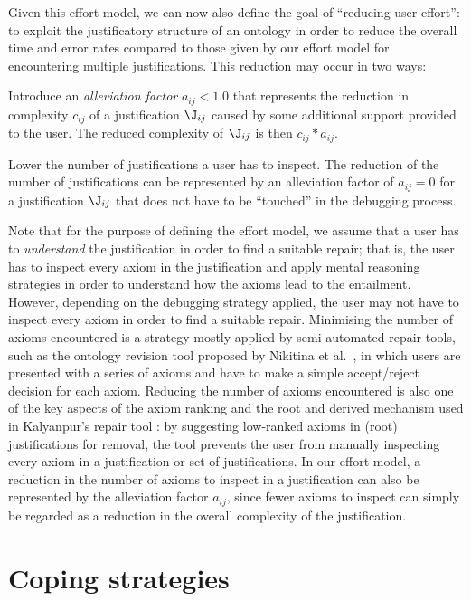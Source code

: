 Given this effort model, we can now also define the goal of \enquote{reducing user effort}: to exploit the justificatory structure of an ontology in order to reduce the overall time and error rates compared to those given by our effort model for encountering multiple justifications. This reduction may occur in two ways:
\begin{compactenum}
\item Introduce an \emph{alleviation factor} $a_{ij} < 1.0 $ that represents the reduction in complexity $c_{ij}$ of a justification $\J_{ij}$ caused by some additional support provided to the user. The reduced complexity of $\J_{ij}$ is then $c_{ij} * a_{ij}$.
\item Lower the number of justifications a user has to inspect. The reduction of the number of justifications can be represented by an alleviation factor of $a_{ij} = 0$ for a justification $\J_{ij}$ that does not have to be \enquote{touched} in the debugging process.
\end{compactenum}

Note that for the purpose of defining the effort model, we assume that a user has to \emph{understand} the justification in order to find a suitable repair; that is, the user has to inspect every axiom in the justification and apply mental reasoning strategies in order to understand how the axioms lead to the entailment. However, depending on the debugging strategy applied, the user may not have to inspect every axiom in order to find a suitable repair. Minimising the number of axioms encountered is a strategy mostly applied by semi-automated repair tools, such as the ontology revision tool proposed by Nikitina et al.\ \cite{nikitina12aa}, in which users are presented with a series of axioms and have to make a simple accept/reject decision for each axiom. Reducing the number of axioms encountered is also one of the key aspects of the axiom ranking and the root and derived mechanism used in Kalyanpur's repair tool \cite{kalyanpur06nm}: by suggesting low-ranked axioms in (root) justifications for removal, the tool prevents the user from manually inspecting every axiom in a justification or set of justifications. In our effort model, a  reduction in the number of axioms to inspect in a justification can also be represented by the alleviation factor $a_{ij}$, since fewer axioms to inspect can simply be regarded as a reduction in the overall complexity of the justification. 



\section{Coping strategies}

